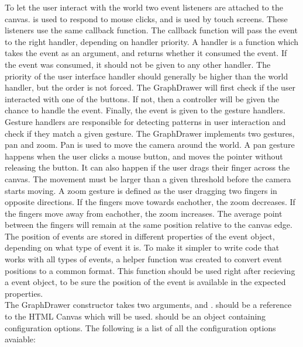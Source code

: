 To let the user interact with the world two event listeners are attached to the canvas.  is used to respond to mouse clicks, and  is used by touch screens. These listeners use the same callback function. The callback function will pass the event to the right handler, depending on handler priority. A handler is a function which takes the event as an argument, and returns whether it consumed the event. If the event was consumed, it should not be given to any other handler. The priority of the user interface handler should generally be higher than the world handler, but the order is not forced. The GraphDrawer will first check if the user interacted with one of the buttons. If not, then a controller will be given the chance to handle the event. Finally, the event is given to the gesture handlers. Gesture handlers are responsible for detecting patterns in user interaction and check if they match a given gesture. The GraphDrawer implements two gestures, pan and zoom. Pan is used to move the camera around the world. A pan gesture happens when the user clicks a mouse button, and moves the pointer without releasing the button. It can also happen if the user drags their finger across the canvas. The movement must be larger than a given threshold before the camera starts moving. A zoom gesture is defined as the user dragging two fingers in opposite directions. If the fingers move towards eachother, the zoom decreases. If the fingers move away from eachother, the zoom increases. The average point between the fingers will remain at the same position relative to the canvas edge. The position of events are stored in different properties of the event object, depending on what type of event it is. To make it simpler to write code that works with all types of events, a helper function  was created to convert event positions to a common format. This function should be used right after recieving a event object, to be sure the position of the event is available in the expected properties.
\\[11pt]
The GraphDrawer constructor takes two arguments,  and .  should be a reference to the HTML Canvas which will be used.  should be an object containing configuration options. The following is a list of all the configuration options avaiable:
